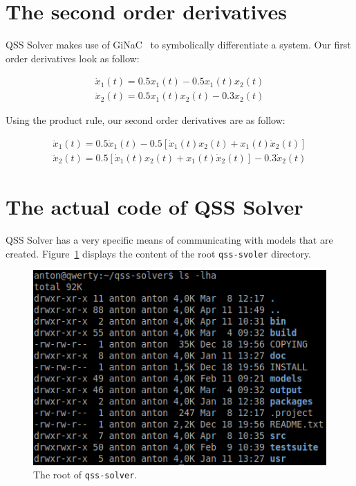 \documentclass[10pt]{article}
\begin{document}
\section{The second order derivatives}

QSS Solver makes use of GiNaC~\cite{ginac} to symbolically differentiate a system. Our first order derivatives look as follow:

\begin{align}
\dot{x}_1(t)  = 0.5 x_1(t) - 0.5 x_1(t) x_2(t) \label{W1}\\[6pt]
\dot{x}_2(t)  = 0.5 x_1(t) x_2(t)  - 0.3 x_2(t)\label{W2}
\end{align}

Using the product rule, our second order derivatives are as follow:

\begin{align}
\ddot{x}_1(t)  = 0.5 \dot{x}_1(t) - 0.5\left[ \dot{x}_1(t)x_2(t) + x_1(t)\dot{x}_2(t)\right]\label{W3} \\[6pt]
\ddot{x}_2(t)  = 0.5\left[ \dot{x}_1(t)x_2(t) + x_1(t)\dot{x}_2(t)\right]  - 0.3 \dot{x}_2(t) \label{W4}
\end{align}

\section{The actual code of QSS Solver}

QSS Solver has a very specific means of communicating with models that are created. Figure~\ref{fig2} displays the content of the root {\tt{qss-svoler}} directory.

\begin{figure}[htbp]
\begin{center}
		\includegraphics[scale=0.5]{./Figures/Selection_117.png}
\end{center}
\vspace{-0.5cm}

\caption{The root of {\tt{qss-solver}}.}\label{fig2}
\end{figure}
\end{document}

